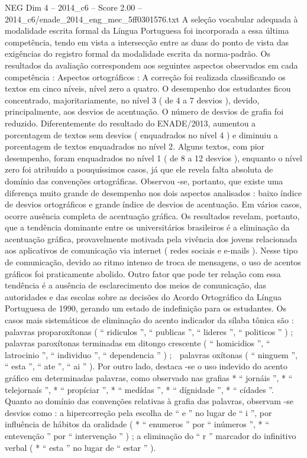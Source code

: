 \begin{textsample}{NEG Dim 4 – 2014\_c6 – Score 2.00 – 2014\_c6/enade\_2014\_eng\_mec\_5ff0301576.txt}
A seleção vocabular adequada à modalidade escrita formal da Língua Portuguesa foi incorporada a essa última competência, tendo em vista a intersecção entre as duas do ponto de vista das exigências do registro formal da modalidade escrita da norma-padrão.
Os resultados da avaliação correspondem aos seguintes aspectos observados em cada competência : Aspectos ortográficos : A correção foi realizada classificando os textos em cinco níveis, nível zero a quatro.
O desempenho dos estudantes ficou concentrado, majoritariamente, no nível 3 ( de 4 a 7 desvios ), devido, principalmente, aos desvios de acentuação.
O número de desvios de grafia foi reduzido.
Diferentemente do resultado do ENADE/2013, aumentou a porcentagem de textos sem desvios ( enquadrados no nível 4 ) e diminuiu a porcentagem de textos enquadrados no nível 2.
Alguns textos, com pior desempenho, foram enquadrados no nível 1 ( de 8 a 12 desvios ), enquanto o nível zero foi atribuído a pouquíssimos casos, já que ele revela falta absoluta de domínio das convenções ortográficas.
Observou -se, portanto, que existe uma diferença muito grande de desempenho nos dois aspectos analisados : baixo índice de desvios ortográficos e grande índice de desvios de acentuação.
Em vários casos, ocorre ausência completa de acentuação gráfica.
Os resultados revelam, portanto, que a tendência dominante entre os universitários brasileiros é a eliminação da acentuação gráfica, provavelmente motivada pela vivência dos jovens relacionada aos aplicativos de comunicação via internet ( redes sociais e e-mails ).
Nesse tipo de comunicação, devido ao ritmo intenso de troca de mensagens, o uso de acentos gráficos foi praticamente abolido.
Outro fator que pode ter relação com essa tendência é a ausência de esclarecimento dos meios de comunicação, das autoridades e das escolas sobre as decisões do Acordo Ortográfico da Língua Portuguesa de 1990, gerando um estado de indefinição para os estudantes.
Os casos mais sistemáticos de eliminação do acento indicador da sílaba tônica são :  palavras proparoxítonas ( “ ridiculos ”, “ publicas ”, “ lideres ”, “ politicos ” ) ;  palavras paroxítonas terminadas em ditongo crescente ( “ homicidios ”, “ latrocinio ”, “ individuo ”, “ dependencia ” ) ;  palavras oxítonas ( “ ninguem ”, “ esta ”, “ ate ”, “ ai ” ).
Por outro lado, destaca -se o uso indevido do acento gráfico em determinadas palavras, como observado nas grafias * “ jornáis ”, * “ telejornaís ”, * “ propíciar ”, * “ medídas ”, * “ dígnidade ”, * “ cídades ”.
Quanto ao domínio das convenções relativas à grafia das palavras, observam -se desvios como : a hipercorreção pela escolha de “ e ” no lugar de “ i ”, por influência de hábitos da oralidade ( * “ enumeros ” por “ inúmeros ”, * “ entevenção ” por “ intervenção ” ) ; a eliminação do “ r ” marcador do infinitivo verbal ( * “ esta ” no lugar de “ estar ” ).

\end{textsample}
